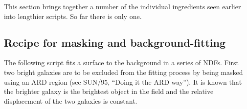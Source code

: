 \documentclass[twoside,11pt]{article}
\newcommand{\latex}[1]{#1}
\newcommand{\xref}[3]{#1}
\newcommand{\xlabel}[1]{}
\newcommand{\NDFref}[1]{\xref{#1}{sun33}{}}
\begin{document}
This section brings together a number of the individual ingredients
seen earlier into lengthier scripts.  So far there is only one.

\subsection{\xlabel{sc4_se_long1}Recipe for masking and background-fitting
\label{sc4_se_long1}}

The following script fits a surface to the background in a series of
\NDFref{{\sf NDF}s}. 
First two bright galaxies are to be excluded from the fitting process by
being \xref{masked using an ARD region}{sun95}{se_ardwork}\latex{ (see
SUN/95, ``Doing it the ARD way'')}.  It is known that the brighter
galaxy is the brightest object in the field and the relative
displacement of the two galaxies is constant.
\end{document}
